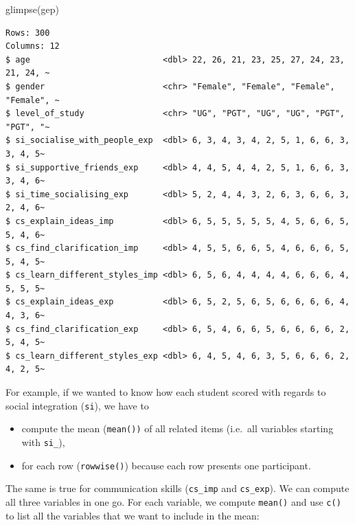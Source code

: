 \documentclass[
  letterpaper,
]{krantz}
\makeatletter
\newenvironment{Shaded}{\begin{snugshade}}{\end{snugshade}}
\newcommand{\FunctionTok}[1]{\textcolor[rgb]{0.28,0.35,0.67}{#1}}
\newcommand{\NormalTok}[1]{\textcolor[rgb]{0.00,0.23,0.31}{#1}}
\newenvironment{kframe}{%
\medskip{}
\setlength{\fboxsep}{.8em}
 \def\at@end@of@kframe{}%
 \ifinner\ifhmode%
  \def\at@end@of@kframe{\end{minipage}}%
  \begin{minipage}{\columnwidth}%
 \fi\fi%
 \def\FrameCommand##1{\hskip\@totalleftmargin \hskip-\fboxsep
 \colorbox{shadecolor}{##1}\hskip-\fboxsep
     \hskip-\linewidth \hskip-\@totalleftmargin \hskip\columnwidth}%
 \MakeFramed {\advance\hsize-\width
   \@totalleftmargin\z@ \linewidth\hsize
   \@setminipage}}%
 {\par\unskip\endMakeFramed%
 \at@end@of@kframe}
\renewenvironment{Shaded}{\begin{kframe}}{\end{kframe}}
\makeatother
\begin{document}
\begin{Shaded}
\begin{Highlighting}[]
\FunctionTok{glimpse}\NormalTok{(gep)}
\end{Highlighting}
\end{Shaded}

\begin{verbatim}
Rows: 300
Columns: 12
$ age                           <dbl> 22, 26, 21, 23, 25, 27, 24, 23, 21, 24, ~
$ gender                        <chr> "Female", "Female", "Female", "Female", ~
$ level_of_study                <chr> "UG", "PGT", "UG", "UG", "PGT", "PGT", "~
$ si_socialise_with_people_exp  <dbl> 6, 3, 4, 3, 4, 2, 5, 1, 6, 6, 3, 3, 4, 5~
$ si_supportive_friends_exp     <dbl> 4, 4, 5, 4, 4, 2, 5, 1, 6, 6, 3, 3, 4, 6~
$ si_time_socialising_exp       <dbl> 5, 2, 4, 4, 3, 2, 6, 3, 6, 6, 3, 2, 4, 6~
$ cs_explain_ideas_imp          <dbl> 6, 5, 5, 5, 5, 5, 4, 5, 6, 6, 5, 5, 4, 6~
$ cs_find_clarification_imp     <dbl> 4, 5, 5, 6, 6, 5, 4, 6, 6, 6, 5, 5, 4, 5~
$ cs_learn_different_styles_imp <dbl> 6, 5, 6, 4, 4, 4, 4, 6, 6, 6, 4, 5, 5, 5~
$ cs_explain_ideas_exp          <dbl> 6, 5, 2, 5, 6, 5, 6, 6, 6, 6, 4, 4, 3, 6~
$ cs_find_clarification_exp     <dbl> 6, 5, 4, 6, 6, 5, 6, 6, 6, 6, 2, 5, 4, 5~
$ cs_learn_different_styles_exp <dbl> 6, 4, 5, 4, 6, 3, 5, 6, 6, 6, 2, 4, 2, 5~
\end{verbatim}

For example, if we wanted to know how each student scored with regards
to social integration (\texttt{si}), we have to

\begin{itemize}
\item
  compute the mean (\texttt{mean())} of all related items (i.e.~all
  variables starting with \texttt{si\_}),
\item
  for each row (\texttt{rowwise()}) because each row presents one
  participant.
\end{itemize}

The same is true for communication skills (\texttt{cs\_imp} and
\texttt{cs\_exp}). We can compute all three variables in one go. For
each variable, we compute \texttt{mean()} and use \texttt{c()} to list
all the variables that we want to include in the mean:
\end{document}
